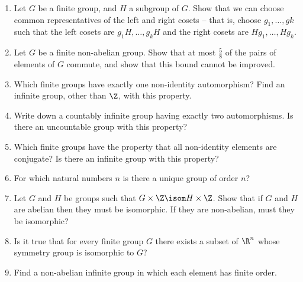 \documentclass[a4paper,12pt]{article}
\begin{document}
\begin{enumerate}
 \item
  Let \(G\) be a finite group, and \(H\) a subgroup of \(G\). Show that we can
  choose common representatives of the left and right cosets – that is, choose
  \(g_1, \dotsc, gk\) such that the left cosets are \(g_1 H, \dotsc, g_k H\) and
  the right cosets are \(H g_1, \dotsc, H g_k\).
 \item
  Let \(G\) be a finite non-abelian group. Show that at most \(\frac 58\) of the
  pairs of elements of \(G\) commute, and show that this bound cannot be
  improved.
 \item
  Which finite groups have exactly one non-identity automorphism? Find an
  infinite group, other than \(\Z\), with this property.
 \item
  Write down a countably infinite group having exactly two automorphisms. Is
  there an uncountable group with this property?
 \item
  Which finite groups have the property that all non-identity elements are
  conjugate? Is there an infinite group with this property?
 \item
  For which natural numbers \(n\) is there a unique group of order \(n\)?
 \item
  Let \(G\) and \(H\) be groups such that \(G \times \Z \isom H \times \Z\).
  Show that if \(G\) and \(H\) are abelian then they must be isomorphic. If they
  are non-abelian, must they be isomorphic?
 \item
  Is it true that for every finite group \(G\) there exists a subset of \(\R^n\)
  whose symmetry group is isomorphic to \(G\)?
 \item
  Find a non-abelian infinite group in which each element has finite order.
\end{enumerate}
\end{document}
